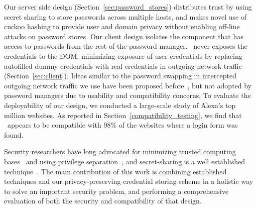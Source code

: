 Our server side design (Section~\ref{sec:password_stores}) distributes trust by using secret sharing to store passwords across multiple hosts, and makes novel use of cuckoo hashing to provide user and domain privacy without enabling off-line attacks on password stores.  Our client design isolates the component that has access to passwords from the rest of the password manager. \SecPass\ never exposes the credentials to the DOM, minimizing exposure of user credentials by replacing autofilled dummy credentials with real credentials in outgoing network traffic (Section~\ref{sec:client}). Ideas similar to the password swapping in intercepted outgoing network traffic we use have been proposed before~\cite{Stock2014}, but not adopted by password managers due to usability and compatibility concerns.  To evaluate the deployability of our design, we conducted a large-scale study of Alexa's top million websites. As reported in Section~\ref{compatibility_testing}, we find that \SecPass\ appears to be compatible with 98\% of the websites where a login form was found.    

Security researchers have long advocated for minimizing trusted computing bases~\cite{rushby1984trusted,dod86,mccune2008flicker} and using privilege separation~\cite{provos2003preventing, bittau2008wedge}, and 
secret-sharing is a well established technique~\cite{shamir1979share}. The main contribution of this work is combining established techniques and our privacy-preserving credential storing scheme in a holistic way to solve an important security problem, and performing a comprehensive evaluation of both the security and compatibility of that design.






